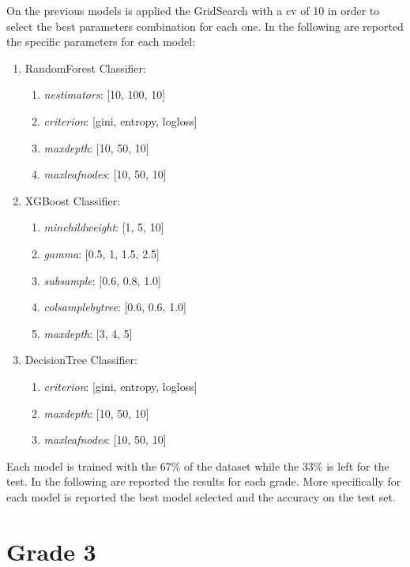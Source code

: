 \documentclass[12pt,a4paper,openright,twoside]{book}
\begin{document}
On the previous models is applied the GridSearch with a cv of 10 in order to select the best parameters combination for each one. In the following are reported the specific parameters for each model:
\begin{enumerate}
    \item RandomForest Classifier:
    \begin{enumerate}
        \item \emph{n\textunderscore estimators}: [10, 100, 10]
        \item \emph{criterion}: [gini, entropy, log\textunderscore loss]
        \item \emph{max\textunderscore depth}: [10, 50, 10]
        \item \emph{max\textunderscore leaf\textunderscore nodes}: [10, 50, 10]
    \end{enumerate}
    \item XGBoost Classifier:
    \begin{enumerate}
        \item \emph{min\textunderscore child\textunderscore weight}: [1, 5, 10]
        \item \emph{gamma}: [0.5, 1, 1.5, 2.5]
        \item \emph{subsample}: [0.6, 0.8, 1.0]
        \item \emph{colsample\textunderscore bytree}: [0.6, 0.6, 1.0]
        \item \emph{max\textunderscore depth}: [3, 4, 5]
    \end{enumerate}
    \item DecisionTree Classifier:
    \begin{enumerate}
        \item \emph{criterion}: [gini, entropy, log\textunderscore loss]
        \item \emph{max\textunderscore depth}: [10, 50, 10]
        \item \emph{max\textunderscore leaf\textunderscore nodes}: [10, 50, 10]
    \end{enumerate}
\end{enumerate}

Each model is trained with the 67\% of the dataset while the 33\% is left for the test.
In the following are reported the results for each grade. More specifically for each model is reported the best model selected and the accuracy on the test set.

\section{Grade 3}
\end{document}
